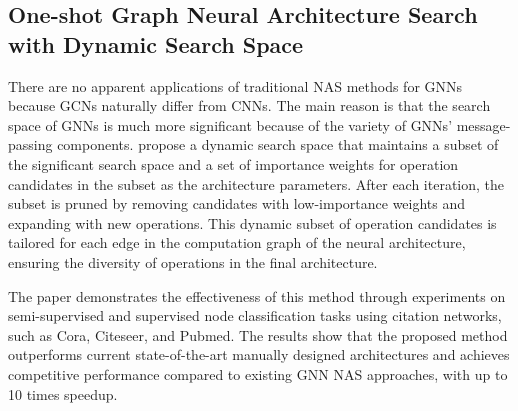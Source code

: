 \subsection{One-shot Graph Neural Architecture Search with Dynamic Search Space}

There are no apparent applications of traditional \gls{NAS} methods for \glspl{GNN} because \glspl{GCN} naturally differ from \glspl{CNN}. The main reason is that the search space of \glspl{GNN} is much more significant because of the variety of \glspl{GNN}' message-passing components. \cite{li2021one} propose a dynamic search space that maintains a subset of the significant search space and a set of importance weights for operation candidates in the subset as the architecture parameters. After each iteration, the subset is pruned by removing candidates with low-importance weights and expanding with new operations. This dynamic subset of operation candidates is tailored for each edge in the computation graph of the neural architecture, ensuring the diversity of operations in the final architecture. 

The paper demonstrates the effectiveness of this method through experiments on semi-supervised and supervised node classification tasks using citation networks, such as Cora, Citeseer, and Pubmed. The results show that the proposed method outperforms current state-of-the-art manually designed architectures and achieves competitive performance compared to existing \gls{GNN} \gls{NAS} approaches, with up to 10 times speedup.